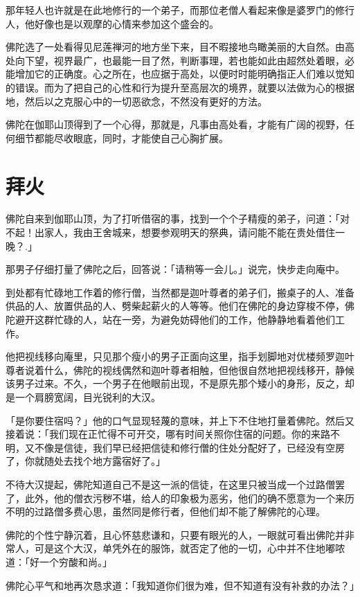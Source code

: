 \documentclass[12pt,twoside,openany]{book}
\begin{document}
那年轻人也许就是在此地修行的一个弟子，而那位老僧人看起来像是婆罗门的修行人，他好像也是以观摩的心情来参加这个盛会的。

佛陀选了一处看得见尼莲禅河的地方坐下来，目不暇接地鸟瞰美丽的大自然。由高处向下望，视界最广，也最能一目了然，判断事理，若也能如此由超然处着眼，必能增加它的正确度。心之所在，也应据于高处，以便时时能明确指正人们难以觉知的错误。而为了把自己的心性和行为提升至高层次的境界，就要以法做为心的根据地，然后以之克服心中的一切恶欲念，不然没有更好的方法。

佛陀在伽耶山顶得到了一个心得，那就是，凡事由高处看，才能有广阔的视野，任何细节都能尽收眼底，同时，才能使自己心胸扩展。

\section{拜火}\label{sec3.4}

佛陀自来到伽耶山顶，为了打听借宿的事，找到一个个子精瘦的弟子，问道：「对不起！出家人，我由王舍城来，想要参观明天的祭典，请问能不能在贵处借住一晚？.」

那男子仔细打量了佛陀之后，回答说：「请稍等一会儿。」说完，快步走向庵中。

到处都有忙碌地工作着的修行僧，当然都是迦叶尊者的弟子们，搬桌子的人、准备供品的人、放置供品的人、劈柴起薪火的人等等。他们在佛陀的身边穿梭不停，佛陀避开这群忙碌的人，站在一旁，为避免妨碍他们的工作，他静静地看着他们工作。

他把视线移向庵里，只见那个瘦小的男子正面向这里，指手划脚地对优楼频罗迦叶尊者说着什么，佛陀的视线偶然和迦叶尊者相触，但他很自然地把视线移开，静候该男子过来。不久，一个男子在他眼前出现，不是原先那个矮小的身形，反之，却是一个肩膀宽阔，目光锐利的大汉。

「是你要住宿吗？」他的口气显现轻蔑的意味，并上下不住地打量着佛陀。然后又接着说：「我们现在正忙得不可开交，哪有时间关照你住宿的问题。你的来路不明，又不像是信徒，我们早已经把信徒和修行僧的住处分配好了，已经没有空房了，你就随处去找个地方露宿好了。」

不待大汉提起，佛陀知道自己不是这一派的信徒，在这里只被当成一个过路僧罢了，此外，他的僧衣污秽不堪，给人的印象极为恶劣，他们的确不愿意为一个来历不明的过路僧多费心思，虽然同是修行者，但他们却不能了解佛陀的心理。

佛陀的个性宁静沉着，且心怀慈悲谦和，只要有眼光的人，一眼就可看出佛陀并非常人，可是这个大汉，单凭外在的服饰，就否定了他的一切，心中并不住地嘟哝道：「好一个穷酸和尚。」

佛陀心平气和地再次恳求道：「我知道你们很为难，但不知道有没有补救的办法？」
\end{document}
